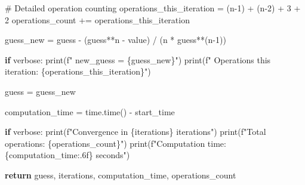 \documentclass[
  letterpaper,
  DIV=11,
  numbers=noendperiod]{scrartcl}
\newenvironment{Shaded}{\begin{snugshade}}{\end{snugshade}}
\newcommand{\BuiltInTok}[1]{\textcolor[rgb]{0.00,0.23,0.31}{#1}}
\newcommand{\CommentTok}[1]{\textcolor[rgb]{0.37,0.37,0.37}{#1}}
\newcommand{\ControlFlowTok}[1]{\textcolor[rgb]{0.00,0.23,0.31}{\textbf{#1}}}
\newcommand{\DecValTok}[1]{\textcolor[rgb]{0.68,0.00,0.00}{#1}}
\newcommand{\NormalTok}[1]{\textcolor[rgb]{0.00,0.23,0.31}{#1}}
\newcommand{\OperatorTok}[1]{\textcolor[rgb]{0.37,0.37,0.37}{#1}}
\newcommand{\SpecialCharTok}[1]{\textcolor[rgb]{0.37,0.37,0.37}{#1}}
\newcommand{\SpecialStringTok}[1]{\textcolor[rgb]{0.13,0.47,0.30}{#1}}
\begin{document}
\begin{Shaded}
\begin{Highlighting}[]
        \CommentTok{\# Detailed operation counting}
\NormalTok{        operations\_this\_iteration }\OperatorTok{=}\NormalTok{ (n}\OperatorTok{{-}}\DecValTok{1}\NormalTok{) }\OperatorTok{+}\NormalTok{ (n}\OperatorTok{{-}}\DecValTok{2}\NormalTok{) }\OperatorTok{+} \DecValTok{3} \OperatorTok{+} \DecValTok{2}
\NormalTok{        operations\_count }\OperatorTok{+=}\NormalTok{ operations\_this\_iteration}
        
\NormalTok{        guess\_new }\OperatorTok{=}\NormalTok{ guess }\OperatorTok{{-}}\NormalTok{ (guess}\OperatorTok{**}\NormalTok{n }\OperatorTok{{-}}\NormalTok{ value) }\OperatorTok{/}\NormalTok{ (n }\OperatorTok{*}\NormalTok{ guess}\OperatorTok{**}\NormalTok{(n}\OperatorTok{{-}}\DecValTok{1}\NormalTok{))}
        
        \ControlFlowTok{if}\NormalTok{ verbose:}
            \BuiltInTok{print}\NormalTok{(}\SpecialStringTok{f"   new\_guess = }\SpecialCharTok{\{}\NormalTok{guess\_new}\SpecialCharTok{\}}\SpecialStringTok{"}\NormalTok{)}
            \BuiltInTok{print}\NormalTok{(}\SpecialStringTok{f"   Operations this iteration: }\SpecialCharTok{\{}\NormalTok{operations\_this\_iteration}\SpecialCharTok{\}}\SpecialStringTok{"}\NormalTok{)}
        
\NormalTok{        guess }\OperatorTok{=}\NormalTok{ guess\_new}
    
\NormalTok{    computation\_time }\OperatorTok{=}\NormalTok{ time.time() }\OperatorTok{{-}}\NormalTok{ start\_time}
    
    \ControlFlowTok{if}\NormalTok{ verbose:}
        \BuiltInTok{print}\NormalTok{(}\SpecialStringTok{f"Convergence in }\SpecialCharTok{\{}\NormalTok{iterations}\SpecialCharTok{\}}\SpecialStringTok{ iterations"}\NormalTok{)}
        \BuiltInTok{print}\NormalTok{(}\SpecialStringTok{f"Total operations: }\SpecialCharTok{\{}\NormalTok{operations\_count}\SpecialCharTok{\}}\SpecialStringTok{"}\NormalTok{)}
        \BuiltInTok{print}\NormalTok{(}\SpecialStringTok{f"Computation time: }\SpecialCharTok{\{}\NormalTok{computation\_time}\SpecialCharTok{:.6f\}}\SpecialStringTok{ seconds"}\NormalTok{)}
    
    \ControlFlowTok{return}\NormalTok{ guess, iterations, computation\_time, operations\_count}
\end{Highlighting}
\end{Shaded}
\end{document}
